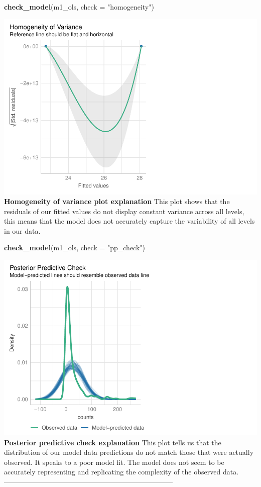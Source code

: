 \documentclass[
]{article}
\newenvironment{Shaded}{\begin{snugshade}}{\end{snugshade}}
\newcommand{\AttributeTok}[1]{\textcolor[rgb]{0.13,0.29,0.53}{#1}}
\newcommand{\FunctionTok}[1]{\textcolor[rgb]{0.13,0.29,0.53}{\textbf{#1}}}
\newcommand{\NormalTok}[1]{#1}
\newcommand{\StringTok}[1]{\textcolor[rgb]{0.31,0.60,0.02}{#1}}
\begin{document}
\begin{Shaded}
\begin{Highlighting}[]
\FunctionTok{check\_model}\NormalTok{(m1\_ols, }\AttributeTok{check =} \StringTok{"homogeneity"}\NormalTok{)}
\end{Highlighting}
\end{Shaded}

\includegraphics{hw1-lobstrs-eds241_files/figure-latex/unnamed-chunk-16-1.pdf}
\textbf{Homogeneity of variance plot explanation} This plot shows that
the residuals of our fitted values do not display constant variance
across all levels, this means that the model does not accurately capture
the variability of all levels in our data.

\begin{Shaded}
\begin{Highlighting}[]
\FunctionTok{check\_model}\NormalTok{(m1\_ols, }\AttributeTok{check =} \StringTok{"pp\_check"}\NormalTok{)}
\end{Highlighting}
\end{Shaded}

\includegraphics{hw1-lobstrs-eds241_files/figure-latex/unnamed-chunk-17-1.pdf}
\textbf{Posterior predictive check explanation} This plot tells us that
the distribution of our model data predictions do not match those that
were actually observed. It speaks to a poor model fit. The model does
not seem to be accurately representing and replicating the complexity of
the observed data.
------------------------------------------------------------------------
\end{document}
